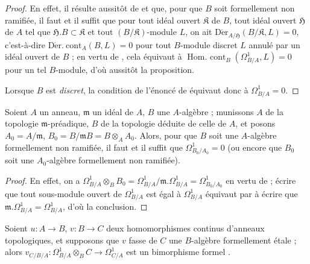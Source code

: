 \begin{proof}
En effet, il résulte aussitôt de  et
 que, pour que $B$ soit formellement non ramifiée, il faut et
il suffit que pour tout idéal ouvert $\mathfrak{K}$ de $B$, tout idéal ouvert
$\mathfrak{H}$ de $A$ tel que $\mathfrak{H}.B\subset\mathfrak{K}$ et tout
$(B/\mathfrak{K})$-module $L$, on ait
$\operatorname{D\acute{e}r}_{A/\mathfrak{H}}(B/\mathfrak{K},L)=0$,
c'est-à-dire $\operatorname{D\acute{e}r.\ cont}_A(B,L)=0$ pour tout
$B$-module discret $L$ annulé par un idéal ouvert de $B$ ; en vertu de
, cela équivaut à
$\operatorname{Hom.\ cont}_B(\Omega^1_{B/A},L)=0$ pour un tel $B$-module,
d'où aussitôt la proposition.

Lorsque $B$ est \emph{discret}, la condition de l'énoncé de
 équivaut donc à $\Omega^1_{B/A}=0$.
\end{proof}

\begin{corollary}[20.7.5]
\label{0.20.7.5-fr}
Soient $A$ un anneau, $\mathfrak{m}$ un idéal de $A$, $B$ une $A$-algèbre ;
munissons $A$ de la topologie $\mathfrak{m}$-préadique, $B$ de la topologie
déduite de celle de $A$, et posons $A_0=A/\mathfrak{m}$,
$B_0=B/\mathfrak{m}B=B\otimes_A A_0$. Alors, pour que $B$ soit une
$A$-algèbre formellement non ramifiée, il faut et il suffit que
$\Omega^1_{B_0/A_0}=0$ \textup{(ou encore que $B_0$ soit une} $A_0$-algèbre
formellement non ramifiée).
\end{corollary}

\begin{proof}
En effet, on a
$\Omega^1_{B/A}\otimes_B B_0=\Omega^1_{B/A}/\mathfrak{m}.\Omega^1_{B/A}
=\Omega^1_{B_0/A_0}$ en vertu de  ; écrire que tout
sous-module ouvert de $\Omega^1_{B/A}$ est égal à $\Omega^1_{B/A}$ équivaut
par  à écrire que
$\mathfrak{m}.\Omega^1_{B/A}=\Omega^1_{B/A}$, d'où la conclusion.
\end{proof}

\begin{proposition}[20.7.6]
\label{0.20.7.6-fr}
Soient $u:A\to B$, $v:B\to C$ deux homomorphismes continus d'anneaux
topologiques, et supposons que $v$ fasse de $C$ une $B$-algèbre formellement
étale ; alors $v_{C/B/A}:\Omega^1_{B/A}\otimes_B C\to\Omega^1_{C/A}$ est un
bimorphisme formel \textup{}.
\end{proposition}


